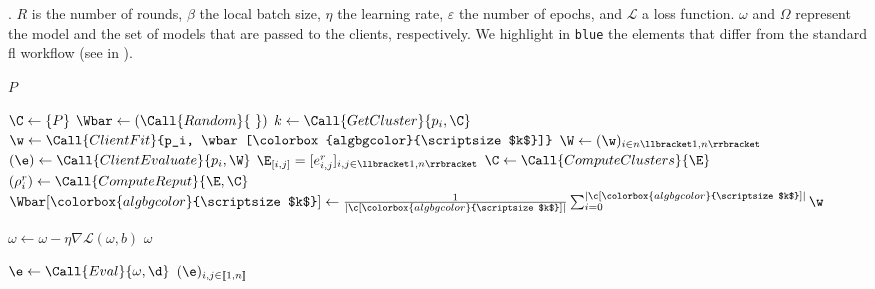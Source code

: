\begin{algorithm}
  \caption{
    \thecontrib.
    $R$ is the number of rounds, $\beta$ the local batch size, $\eta$ the learning rate, $\varepsilon$ the number of epochs, and $\mathcal{L}$ a loss function.
    $\omega$ and $\Omega$ represent the model and the set of models that are passed to the clients, respectively.
    We highlight in \colorbox{algbgcolor}{\texttt{blue}} the elements that differ from the standard \gls{fl} workflow (see  in ).
    \label{alg:xeval}
  }
  \setlength{\fboxsep}{1pt}
  \newcommand{\hl}[1]{\colorbox{algbgcolor}{\scriptsize $#1$}}
  \begin{small}
    \begin{algorithmic}[1]
      \Require $P$
  
\BeginBox[fill=algbgcolor]
        \State $ \C \gets \{ P \}$
\EndBox
        \State $ \Wbar \gets (\Call{Random}{\ })$
      \EndWith
      \Statex
\BeginBox[fill=algbgcolor]
          \State $k \gets \Call{GetCluster}{p_i, \C}$
\EndBox
          \State $\w \gets \Call{ClientFit}{p_i, \wbar[\hl{k}]}$
        \EndFor
        \Statex
\BeginBox[fill=algbgcolor]
        \State $ \W \gets (\w)_{i \in n \llbracket 1,n \rrbracket} $ 
\EndBox
        \Statex
\BeginBox[fill=algbgcolor]
          \State $(\e) \gets \Call{ClientEvaluate}{p_i, \W}$
        \EndFor
        \State $ \E_{[i,j]} = [e_{i,j}^r]_{i,j \in \llbracket 1,n \rrbracket} $
\EndBox
        \Statex
\BeginBox[fill=algbgcolor]
        \State $ \C \gets \Call{ComputeClusters}{\E}$              
        \ForAll{$  \c \in \C $}
          \State $ (\rho_i^r) \gets \Call{ComputeReput}{\E, \C}$   
\EndBox
          \State $ \Wbar[\hl{k}] \gets \frac{1}{|\c[\hl{k}]|} \sum_{i=0}^{|\c[\hl{k}]|} \w$
        \EndFor
      \EndFor
  
      \Statex %
            \State $ \omega \gets \omega - \eta \nabla \mathcal{L}(\omega,b) $
          \EndFor
        \EndFor
        \Statex
        \State \Return $\omega$
      \EndFunction
  
      \Statex %
\BeginBox[fill=algbgcolor]
       
          \State $ \e \gets \Call{Eval}{\omega, \d}$
        \EndFor
        \State \Return $(\e)_{i,j \in [\![ 1,n ]\!]}$
      \EndFunction
\EndBox
    \end{algorithmic}
  \end{small}
\end{algorithm}


